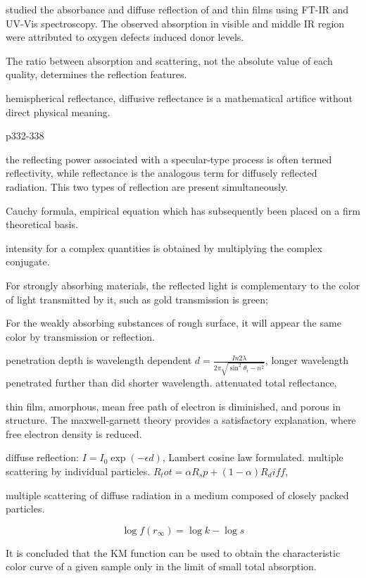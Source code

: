 \citeauthor{Morandi2005} studied the absorbance and diffuse reflection of  and  thin films using FT-IR and UV-Vis spectroscopy. The observed absorption in visible and middle IR region were attributed to oxygen defects induced donor levels.\cite{Morandi2005}

The ratio between absorption and scattering, not the absolute value of each quality, determines the reflection features.


\iffalse

hemispherical reflectance, 
diffusive reflectance is a mathematical artifice without direct physical meaning. 

p332-338

the reflecting power associated with a specular-type process is often termed reflectivity, while reflectance is the analogous term for diffusely reflected radiation. This two types of reflection are present simultaneously. 

Cauchy formula, empirical equation which has subsequently been placed on a firm theoretical basis. 

intensity for a complex quantities is obtained by multiplying the complex conjugate. 

For strongly absorbing materials, the reflected light is complementary to the color of light transmitted by it, such as gold transmission is green; 

For the weakly absorbing substances of rough surface, it will appear the same color by transmission or reflection. 

penetration depth is wavelength dependent $d = \frac{In2 \lambda}{2\pi \sqrt{\sin^2\theta_i - n^2}}$, longer wavelength penetrated further than did shorter wavelength. attenuated total reflectance, 

thin film, amorphous, mean free path of electron is diminished, and porous in structure. The maxwell-garnett theory provides a satisfactory explanation, where free electron density is reduced. 

diffuse reflection: $I = I_0 \exp(-\epsilon d)$, Lambert cosine law formulated. multiple scattering by individual particles. 
$R_tot = \alpha R_sp + (1- \alpha) R_diff $, 

multiple scattering of diffuse radiation in a medium composed of closely packed particles. 

\[
\log{f(r_\infty) = \log{k} - \log{s}}
\]

It is concluded that the KM function can be used to obtain the characteristic color curve of a given sample only in the limit of small total absorption. 

